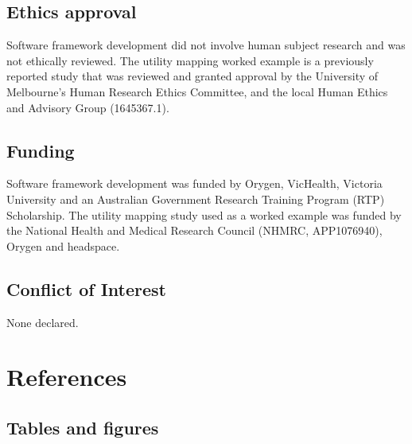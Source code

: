 \documentclass[sn-vancouver,Numbered,pdflatex]{sn-jnl}
\theoremstyle{remark}
\theoremstyle{definition}
\begin{document}
\hypertarget{ethics-approval}{%
\subsection*{Ethics approval}\label{ethics-approval}}

Software framework development did not involve human subject research and was not ethically reviewed. The utility mapping worked example is a previously reported study that was reviewed and granted approval by the University of Melbourne's Human Research Ethics Committee, and the local Human Ethics and Advisory Group (1645367.1).

\hypertarget{funding}{%
\subsection*{Funding}\label{funding}}

Software framework development was funded by Orygen, VicHealth, Victoria University and an Australian Government Research Training Program (RTP) Scholarship. The utility mapping study used as a worked example was funded by the National Health and Medical Research Council (NHMRC, APP1076940), Orygen and headspace.

\hypertarget{conflict-of-interest}{%
\subsection*{Conflict of Interest}\label{conflict-of-interest}}

None declared.

\newpage

\hypertarget{references}{%
\section*{References}\label{references}}

\newpage

\hypertarget{tables-and-figures}{%
\subsection*{Tables and figures}\label{tables-and-figures}}
\end{document}
